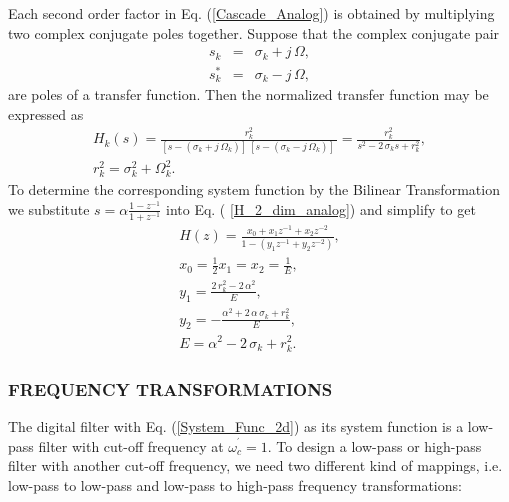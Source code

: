 \documentclass{sebase}
\begin{document}
Each second order factor in Eq. (\ref{Cascade_Analog}) is obtained by
multiplying two complex conjugate poles together. Suppose that the complex
conjugate pair 
\begin{eqnarray}
s_{k} &=&\sigma _{k}+j\,\Omega , \\
s_{k}^{\ast } &=&\sigma _{k}-j\,\Omega ,
\end{eqnarray}
are poles of a transfer function. Then the normalized transfer function may
be expressed as 
\begin{gather}
H_{k}(s)=\frac{r_{k}^{2}}{\left[ s-\left( \sigma _{k}+j\,\Omega _{k}\right) %
\right] \,\left[ s-\left( \sigma _{k}-j\,\Omega _{k}\right) \right] \,}=%
\frac{r_{k}^{2}}{s^{2}-2\,\sigma _{k}s+r_{k}^{2}},  \label{H_2_dim_analog} \\
r_{k}^{2}=\sigma _{k}^{2}+\Omega _{k}^{2}.
\end{gather}
To determine the corresponding system function by the Bilinear
Transformation we substitute $s=\alpha \frac{1-z^{-1}}{1+z^{-1}}$ into Eq. (%
\ref{H_2_dim_analog}) and simplify to get 
\begin{gather}
H\left( z\right) =\frac{x_{0}+x_{1}z^{-1}+x_{2}z^{-2}}{1-\left(
y_{1}z^{-1}+y_{2}z^{-2}\right) },  \label{System_Func_2d} \\
x_{0}=\frac{1}{2}x_{1}=x_{2}=\frac{1}{E}, \\
y_{1}=\frac{2\,r_{k}^{2}-2\,\alpha ^{2}}{E}, \\
y_{2}=-\frac{\alpha ^{2}+2\,\alpha \,\sigma _{k}+r_{k}^{2}}{E}, \\
E=\alpha ^{2}-2\,\sigma _{k}+r_{k}^{2}.
\end{gather}

\subsubsection{FREQUENCY TRANSFORMATIONS}

The digital filter with Eq. (\ref{System_Func_2d}) as its system function is
a low-pass filter with cut-off frequency at $\omega _{c}^{^{\prime }}=1$. To
design a low-pass or high-pass filter with another cut-off frequency, we
need two different kind of mappings, i.e. low-pass to low-pass and low-pass
to high-pass frequency transformations:
\end{document}
